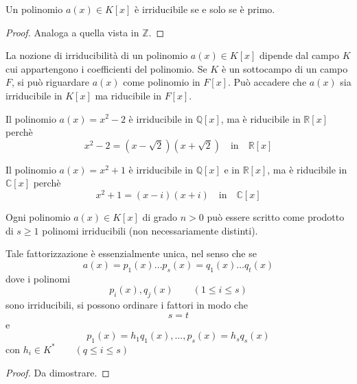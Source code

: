 \documentclass[a4paper,12pt, oneside]{book}
\begin{document}
			\begin{teorema}
				Un polinomio $a(x) \in K[x]$ è irriducibile se e solo se è primo.
				
				\begin{proof}
					Analoga a quella vista in $\mathbb{Z}$.
				\end{proof}
			\end{teorema}
			
			\begin{osservazione}
				La nozione di irriducibilità di un polinomio $a(x) \in K[x]$ dipende dal campo $K$ cui appartengono i coefficienti del polinomio.
				Se $K$ è un sottocampo di un campo $F$, si può riguardare $a(x)$ come polinomio in $F[x]$. Può accadere che $a(x)$ sia irriducibile in $K[x]$ ma riducibile in $F[x]$.
			\end{osservazione}
			
			\begin{shaded}
				\begin{esempio}
					Il polinomio $a(x) = x^2 -2$ è irriducibile in $\mathbb{Q}[x]$, ma è riducibile in $\mathbb{R}[x]$ perchè
					$$x^2 -2 = (x-\sqrt{2}) (x+\sqrt{2}) \quad \mbox{in} \quad \mathbb{R}[x]$$
				\end{esempio}
				\begin{esempio}
					Il polinomio $a(x) = x^2 +1$ è irriducibile in $\mathbb{Q}[x]$ e in $\mathbb{R}[x]$, ma è riducibile in $\mathbb{C}[x]$ perchè
					$$x^2 +1 = (x-i) (x+i) \quad \mbox{in} \quad \mathbb{C}[x]$$
				\end{esempio}
			\end{shaded}
			
			\begin{teorema}
				Ogni polinomio $a(x) \in K[x]$ di grado $n>0$ può essere scritto come prodotto di $s \geq 1$ polinomi irriducibili (non necessariamente distinti).
				
				Tale fattorizzazione è essenzialmente unica, nel senso che se 
				$$a(x) = p_1(x) \dots p_s(x) = q_1(x) \dots q_t(x)$$ dove i polinomi 
				$$p_i(x), q_j(x) \qquad (1 \leq i \leq s)$$ sono irriducibili, si possono ordinare i fattori in modo che $$s=t$$ e 
				$$p_1(x) = h_1q_1(x), \dots , p_s(x) = h_sq_s(x)$$
				con $h_i \in K^{*} \qquad (q \leq i \leq s)$
				
				\begin{proof}
					Da dimostrare. %
				\end{proof}
			\end{teorema}
			
\end{document}
